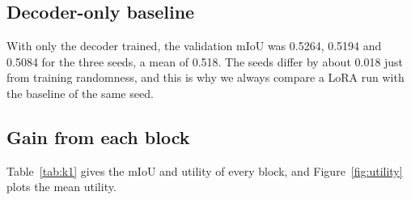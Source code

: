 \documentclass[11pt,a4paper]{report}
\begin{document}
\subsection{Decoder-only baseline}

With only the decoder trained, the validation mIoU was 0.5264, 0.5194 and 0.5084 for the three seeds, a mean of 0.518. The seeds differ by about 0.018 just from training randomness, and this is why we always compare a LoRA run with the baseline of the same seed.

\subsection{Gain from each block}

Table~\ref{tab:k1} gives the mIoU and utility of every block, and Figure~\ref{fig:utility} plots the mean utility.
\end{document}
